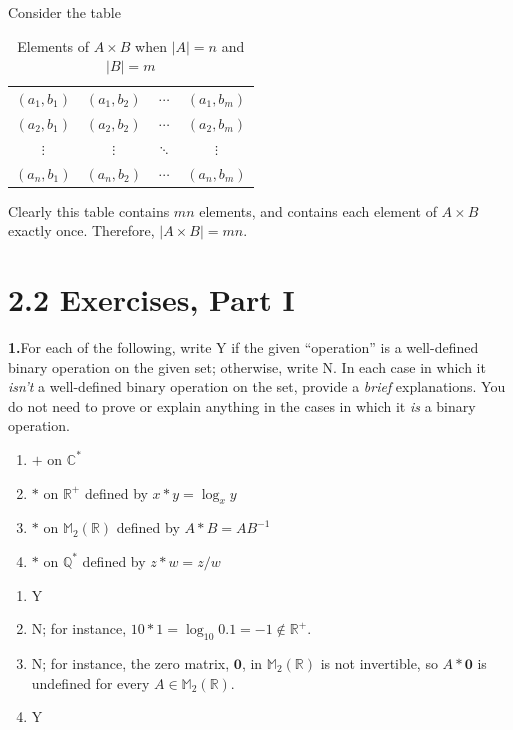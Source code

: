 \documentclass[10pt,]{book}
\theoremstyle{plain}
\theoremstyle{definition}
\theoremstyle{definition}
\theoremstyle{definition}
\theoremstyle{definition}
\numberwithin{equation}{section}
\def\R{\mathbb{R}}
\def\Q{\mathbb{Q}}
\def\C{\mathbb{C}}
\def\M{\mathbb{M}}
\def\0{\mathbf 0}
\begin{document}
%
\par
Consider the table%
\begin{table}
\centering
\begin{tabular}{cccc}
\((a_1,b_1)\)&\((a_1,b_2)\)&\(\cdots\)&\((a_1,b_m)\)\tabularnewline[0pt]
\((a_2,b_1)\)&\((a_2,b_2)\)&\(\cdots\)&\((a_2,b_m)\)\tabularnewline[0pt]
\(\vdots\)&\(\vdots\)&\(\ddots\)&\(\vdots\)\tabularnewline[0pt]
\((a_n,b_1)\)&\((a_n,b_2)\)&\(\cdots\)&\((a_n,b_m)\)
\end{tabular}
\caption{Elements of \(A\times B\) when \(|A|=n\) and \(|B|=m\)\label{cardmn}}
\end{table}
Clearly this table contains \(mn\) elements, and contains each element of \(A\times B\) exactly once. Therefore, \(|A\times B|=mn\).%
\par\smallskip
\section*{2.2 Exercises, Part I}
\noindent\textbf{1.}\quad{}For each of the following, write Y if the given ``operation'' is a well-defined binary operation on the given set; otherwise, write N. In each case in which it \emph{isn't} a well-defined binary operation on the set, provide a \emph{brief} explanations. You do not need to prove or explain anything in the cases in which it \emph{is} a binary operation. \leavevmode%
\begin{enumerate}[label=(\alph*)]
\item\hypertarget{li-58}{}\(+\) on \(\C^*\)%
\item\hypertarget{li-59}{}\(*\) on \(\R^+\) defined by \(x*y=\log_x y\)%
\item\hypertarget{li-60}{}\(*\) on \(\M_2(\R)\) defined by \(A*B=AB^{-1}\)%
\item\hypertarget{li-61}{}\(*\) on \(\Q^*\) defined by \(z*w=z/w\)%
\end{enumerate}
%
\par\smallskip
\leavevmode%
\begin{enumerate}[label=(\alph*)]
\item\hypertarget{li-62}{}Y%
\item\hypertarget{li-63}{}N; for instance, \(10*1=\log_{10}0.1=-1\not\in\R^+\).%
\item\hypertarget{li-64}{}N; for instance, the zero matrix, \(\0\), in \(\M_2(\R)\) is not invertible, so \(A*\0\) is undefined for every \(A\in\M_2(\R)\).%
\item\hypertarget{li-65}{}Y%
\end{enumerate}
\end{document}
